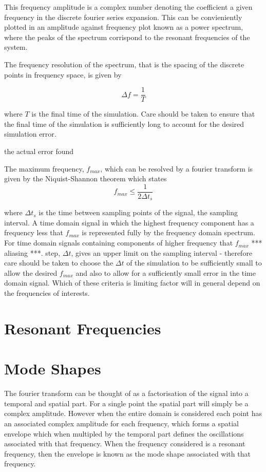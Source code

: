 This frequency amplitude is a complex number denoting the coefficient a given
frequency in the discrete fourier series expansion. This can be convieniently
plotted in an amplitude against frequency plot known as a power spectrum, where
the peaks of the spectrum corrispond to the resonant frequencies of the system.

The frequency resolution of the spectrum, that is the spacing of the discrete
points in frequency space, is given by

$$
\Delta f = \frac{1}{T}
$$

where $T$ is the final time of the simulation. Care should be taken to ensure
that the final time of the simulation is sufficiently long to account for the
desired simulation error.

the actual error found


The maximum frequency, $f_{max}$, which can be resolved by a fourier transform
is given by the Niquist-Shannon theorem which states
$$
f_{max} \leq \frac{1}{2 \Delta t_s}
$$

where $\Delta t_s$ is the time between sampling points of the signal, the
sampling interval. A time domain signal in which the highest frequency component
has a frequency less that $f_{max}$ is represented fully by the frequency domain
spectrum. For time domain signals containing components of higher frequency that
$f_{max}$ *** aliasing ***. %
step, $\Delta t$, gives an upper limit on the sampling interval - therefore care
should be taken to choose the $\Delta t$ of the simulation to be sufficiently
small to allow the desired $f_{max}$ and also to allow for a sufficiently small
error in the time domain signal. Which of these criteria is limiting factor will
in general depend on the frequencies of interests.

\section{Resonant Frequencies}
\section{Mode Shapes}

The fourier transform can be thought of as a factorisation of the signal into a
temporal and spatial part. For a single point the spatial part will simply be a
complex amplitude. However when the entire domain is considered each point has
an associated complex amplitude for each frequency, which forms a spatial
envelope which when multipled by the temporal part defines the oscillations
associated with that frequency. When the frequency considered is a resonant
frequency, then the envelope is known as the mode shape associated with that
frequency.

